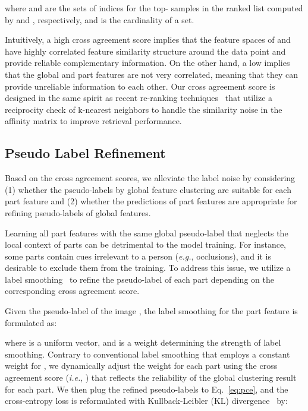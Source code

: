 \documentclass[10pt,twocolumn,letterpaper]{article}
\newcommand{\paragraphTitle}[1]{\vspace{1mm}\noindent{\textbf{#1}\hspace{1mm}}}
\begin{document}
    where  and  are the sets of indices for the top- samples in the ranked list computed by  and , respectively, and  is the cardinality of a set. 
    
    Intuitively, a high cross agreement score  implies that the feature spaces of  and  have highly correlated feature similarity structure around the data point  and provide reliable complementary information. 
    On the other hand, a low  implies that the global and part features are not very correlated, meaning that they can provide unreliable information to each other.
    Our cross agreement score is designed in the same spirit as recent re-ranking techniques~\cite{sarfraz2018pose, zhong2017re, yang2019efficient, iscen2017efficient} that utilize a reciprocity check of k-nearest neighbors to handle the similarity noise in the affinity matrix to improve retrieval performance.
    
\subsection{Pseudo Label Refinement} \label{ssec:3-3}
    Based on the cross agreement scores, we alleviate the label noise by considering (1) whether the pseudo-labels by global feature clustering are suitable for each part feature and (2) whether the predictions of part features are appropriate for refining pseudo-labels of global features.

\paragraphTitle{Agreement-aware label smoothing.}
    Learning all part features with the same global pseudo-label that neglects the local context of parts can be detrimental to the model training.
    For instance, some parts contain cues irrelevant to a person (\textit{e.g.}, occlusions), and it is desirable to exclude them from the training.
    To address this issue, we utilize a label smoothing~\cite{szegedy2016rethinking, lukasik2020does} to refine the pseudo-label of each part depending on the corresponding cross agreement score.

    Given the pseudo-label  of the image , the label smoothing for the part feature  is formulated as:
    
    where  is a uniform vector, and  is a weight determining the strength of label smoothing.
    Contrary to conventional label smoothing that employs a constant weight for ,
    we dynamically adjust the weight for each part using the cross agreement score (\textit{i.e.}, ) 
    that reflects the reliability of the global clustering result for each part.
    We then plug the refined pseudo-labels  to Eq.~\eqref{eq:pce}, and the cross-entropy loss is reformulated with Kullback-Leibler (KL) divergence~\cite{pereyra2017regularizing} by:
    
\end{document}
